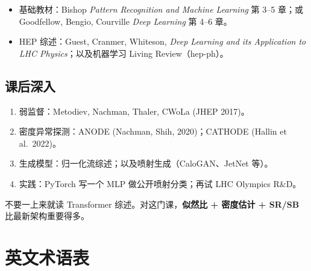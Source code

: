 \documentclass[11pt,a4paper]{article}
\theoremstyle{definition}
\theoremstyle{plain}
\theoremstyle{remark}
\begin{document}
\begin{itemize}[leftmargin=1.4em]
  \item 基础教材：Bishop \emph{Pattern Recognition and Machine Learning} 第 3--5 章；或 Goodfellow, Bengio, Courville \emph{Deep Learning} 第 4--6 章。
  \item HEP 综述：Guest, Cranmer, Whiteson, \emph{Deep Learning and its Application to LHC Physics}；以及机器学习 Living Review（hep-ph）。
\end{itemize}

\subsection{课后深入}

\begin{enumerate}[leftmargin=1.6em]
  \item 弱监督：Metodiev, Nachman, Thaler, CWoLa (JHEP 2017)。
  \item 密度异常探测：ANODE (Nachman, Shih, 2020)；CATHODE (Hallin et al.\ 2022)。
  \item 生成模型：归一化流综述；以及喷射生成（CaloGAN、JetNet 等）。
  \item 实践：PyTorch 写一个 MLP 做公开喷射分类；再试 LHC Olympics R\&D。
\end{enumerate}

不要一上来就读 Transformer 综述。对这门课，\textbf{似然比 + 密度估计 + SR/SB} 比最新架构重要得多。

\section{英文术语表}
\label{sec:glossary}
\end{document}
